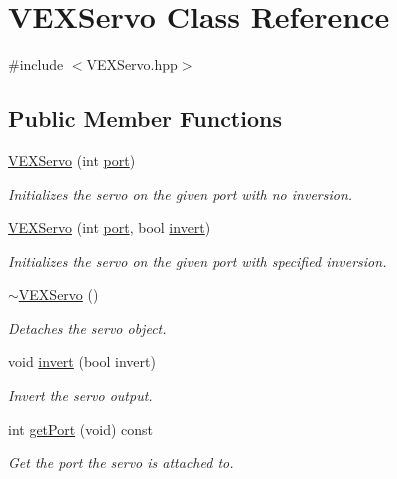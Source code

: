\hypertarget{class_v_e_x_servo}{}\section{V\+E\+X\+Servo Class Reference}
\label{class_v_e_x_servo}


{\ttfamily \#include $<$V\+E\+X\+Servo.\+hpp$>$}

\subsection*{Public Member Functions}
\begin{DoxyCompactItemize}
\item 
\hyperlink{class_v_e_x_servo_ade28b71edfd878f947a63bbec722036b}{V\+E\+X\+Servo} (int \hyperlink{class_v_e_x_servo_a34333ff9091be5124f25597c95593291}{port})
\begin{DoxyCompactList}\small\item\em Initializes the servo on the given port with no inversion. \end{DoxyCompactList}\item 
\hyperlink{class_v_e_x_servo_a50cbd7885996e04d3c77b61b76d2ed91}{V\+E\+X\+Servo} (int \hyperlink{class_v_e_x_servo_a34333ff9091be5124f25597c95593291}{port}, bool \hyperlink{class_v_e_x_servo_a9bd31afec53e4c45d264c2480b0c0e5e}{invert})
\begin{DoxyCompactList}\small\item\em Initializes the servo on the given port with specified inversion. \end{DoxyCompactList}\item 
\hyperlink{class_v_e_x_servo_a9a25c4d4400daadf45b19b1fa47710ab}{$\sim$\+V\+E\+X\+Servo} ()
\begin{DoxyCompactList}\small\item\em Detaches the servo object. \end{DoxyCompactList}\item 
void \hyperlink{class_v_e_x_servo_a9bd31afec53e4c45d264c2480b0c0e5e}{invert} (bool invert)
\begin{DoxyCompactList}\small\item\em Invert the servo output. \end{DoxyCompactList}\item 
int \hyperlink{class_v_e_x_servo_ab3759e3c166068f8c512420b588efacd}{get\+Port} (void) const
\begin{DoxyCompactList}\small\item\em Get the port the servo is attached to. \end{DoxyCompactList}\item 

\end{DoxyCompactItemize}
